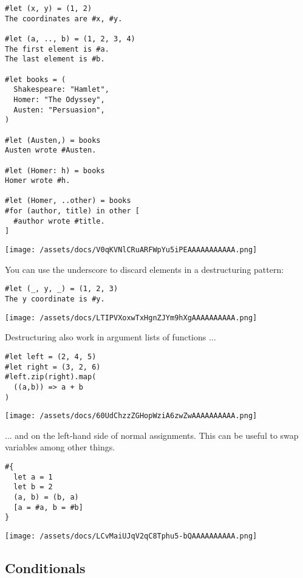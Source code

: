 \begin{verbatim}
#let (x, y) = (1, 2)
The coordinates are #x, #y.

#let (a, .., b) = (1, 2, 3, 4)
The first element is #a.
The last element is #b.

#let books = (
  Shakespeare: "Hamlet",
  Homer: "The Odyssey",
  Austen: "Persuasion",
)

#let (Austen,) = books
Austen wrote #Austen.

#let (Homer: h) = books
Homer wrote #h.

#let (Homer, ..other) = books
#for (author, title) in other [
  #author wrote #title.
]
\end{verbatim}

\texttt{[image: /assets/docs/V0qKVNlCRuARFWpYu5iPEAAAAAAAAAAA.png]}

You can use the underscore to discard elements in a destructuring
pattern:

\begin{verbatim}
#let (_, y, _) = (1, 2, 3)
The y coordinate is #y.
\end{verbatim}

\texttt{[image: /assets/docs/LTIPVXoxwTxHgnZJYm9hXgAAAAAAAAAA.png]}

Destructuring also work in argument lists of functions ...

\begin{verbatim}
#let left = (2, 4, 5)
#let right = (3, 2, 6)
#left.zip(right).map(
  ((a,b)) => a + b
)
\end{verbatim}

\texttt{[image: /assets/docs/60UdChzzZGHopWziA6zwZwAAAAAAAAAA.png]}

... and on the left-hand side of normal assignments. This can be useful
to swap variables among other things.

\begin{verbatim}
#{
  let a = 1
  let b = 2
  (a, b) = (b, a)
  [a = #a, b = #b]
}
\end{verbatim}

\texttt{[image: /assets/docs/LCvMaiUJqV2qC8Tphu5-bQAAAAAAAAAA.png]}

\subsection{Conditionals}\label{conditionals}

